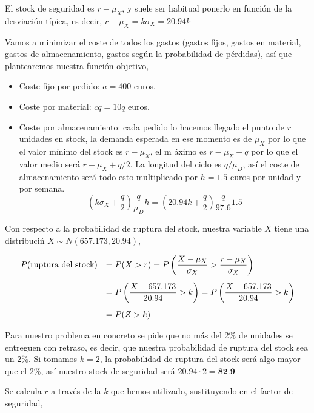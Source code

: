 \documentclass[a4paper,12pt]{article}
\begin{document}
El stock de seguridad es $r - \mu_X$, y suele ser habitual ponerlo en funci\'on de la desviaci\'on t\'ipica, es decir, $r - \mu_X = k\sigma_X = 20.94k$

Vamos a minimizar el coste de todos los gastos (gastos fijos, gastos en material, gastos de almacenamiento, gastos según la probabilidad de pérdidas), as\'i que plantearemos nuestra funci\'on objetivo,

\begin{itemize}
\item[] Coste fijo por pedido: $a = 400$ euros.
\item[] Coste por material: $cq = 10q$ euros.
\item[] Coste por almacenamiento: cada pedido lo hacemos llegado el punto de $r$ unidades en stock, la demanda esperada en ese momento es de $\mu_X$ por lo que el valor m\'inimo del stock es $r - \mu_X$, el m \'aximo es $r - \mu_X + q$ por lo que el valor medio ser\'a $r - \mu_X + q/2$. La longitud del ciclo es $q/\mu_D$, as\'i el coste de almacenamiento ser\'a todo esto multiplicado por $h = 1.5$ euros por unidad y por semana.
$$ (k\sigma_X + \dfrac{q}{2})\dfrac{q}{\mu_D} h = (20.94k + \dfrac{q}{2})\dfrac{q}{97.6} 1.5$$
\end{itemize}

Con respecto a la probabilidad de ruptura del stock, nuestra variable $X$ tiene una distribuci\'n $ X\sim N(657.173, 20.94)$,

\begin{equation*}
\begin{array}{l l}
 P(\text{ruptura del stock}) & =  P(X > r) = P\left(\dfrac{X - \mu_X}{\sigma_X} > \dfrac{r-\mu_X}{\sigma_X}\right) \\[0.5cm]
 \, &   = P\left(\dfrac{X - 657.173}{20.94} > k\right) = P\left(\dfrac{X - 657.173}{20.94} > k\right) \\[0.5cm]
 \, &   = P(Z > k)
\end{array}
\end{equation*}

Para nuestro problema en concreto se pide que no m\'as del 2\% de unidades se entreguen con retraso, es decir, que nuestra probabilidad de ruptura del stock sea un 2\%. Si tomamos $k = 2$, la probabilidad de ruptura del stock ser\'a algo mayor que el 2\%, as\'i nuestro stock de seguridad ser\'a $20.94 \cdot 2 = \textbf{82.9}$

Se calcula \textbf{$r$} a trav\'es de la $k$ que hemos utilizado, sustituyendo en el factor de seguridad,
\end{document}
